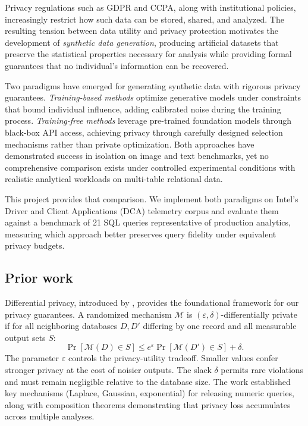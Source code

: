 \documentclass[12pt,letterpaper]{article}
\renewcommand{\_}{\textunderscore\allowbreak}
\begin{document}
Privacy regulations such as GDPR and CCPA, along with institutional policies, increasingly restrict how such data can be stored, shared, and analyzed. The resulting tension between data utility and privacy protection motivates the development of \textit{synthetic data generation}, producing artificial datasets that preserve the statistical properties necessary for analysis while providing formal guarantees that no individual's information can be recovered.

Two paradigms have emerged for generating synthetic data with rigorous privacy guarantees. \textit{Training-based methods} optimize generative models under constraints that bound individual influence, adding calibrated noise during the training process. \textit{Training-free methods} leverage pre-trained foundation models through black-box API access, achieving privacy through carefully designed selection mechanisms rather than private optimization. Both approaches have demonstrated success in isolation on image and text benchmarks, yet no comprehensive comparison exists under controlled experimental conditions with realistic analytical workloads on multi-table relational data.

This project provides that comparison. We implement both paradigms on Intel's Driver and Client Applications (DCA) telemetry corpus and evaluate them against a benchmark of 21 SQL queries representative of production analytics, measuring which approach better preserves query fidelity under equivalent privacy budgets.

\subsection{Prior work}

Differential privacy, introduced by \citet{dwork2014algorithmic}, provides the foundational framework for our privacy guarantees. A randomized mechanism $\mathcal{M}$ is $(\varepsilon, \delta)$-differentially private if for all neighboring databases $D, D'$ differing by one record and all measurable output sets $S$:
\begin{equation}
    \Pr[\mathcal{M}(D) \in S] \leq e^{\varepsilon} \Pr[\mathcal{M}(D') \in S] + \delta.
\end{equation}
The parameter $\varepsilon$ controls the privacy-utility tradeoff. Smaller values confer stronger privacy at the cost of noisier outputs. The slack $\delta$ permits rare violations and must remain negligible relative to the database size. The work established key mechanisms (Laplace, Gaussian, exponential) for releasing numeric queries, along with composition theorems demonstrating that privacy loss accumulates across multiple analyses.
\end{document}

